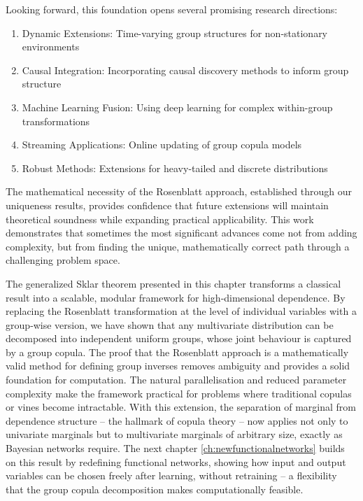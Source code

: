 Looking forward, this foundation opens several promising research directions:
\begin{enumerate}
\item Dynamic Extensions: Time-varying group structures for non-stationary environments
\item Causal Integration: Incorporating causal discovery methods to inform group structure
\item Machine Learning Fusion: Using deep learning for complex within-group transformations
\item Streaming Applications: Online updating of group copula models
\item Robust Methods: Extensions for heavy-tailed and discrete distributions
\end{enumerate}

The mathematical necessity of the Rosenblatt approach, established through our uniqueness results, provides confidence that future extensions will maintain theoretical soundness while expanding practical applicability.
This work demonstrates that sometimes the most significant advances come not from adding complexity, but from finding the unique, mathematically correct path through a challenging problem space.

The generalized Sklar theorem presented in this chapter transforms a classical result into a scalable, modular framework for high‑dimensional dependence. By replacing the Rosenblatt transformation at the level of individual variables with a group‑wise version, we have shown that any multivariate distribution can be decomposed into independent uniform groups, whose joint behaviour is captured by a group copula. The proof that the Rosenblatt approach is a mathematically valid method for defining group inverses removes ambiguity and provides a solid foundation for computation. The natural parallelisation and reduced parameter complexity make the framework practical for problems where traditional copulas or vines become intractable. With this extension, the separation of marginal from dependence structure – the hallmark of copula theory – now applies not only to univariate marginals but to multivariate marginals of arbitrary size, exactly as Bayesian networks require. The next chapter \ref{ch:newfunctionalnetworks} builds on this result by redefining functional networks, showing how input and output variables can be chosen freely after learning, without retraining – a flexibility that the group copula decomposition makes computationally feasible. 